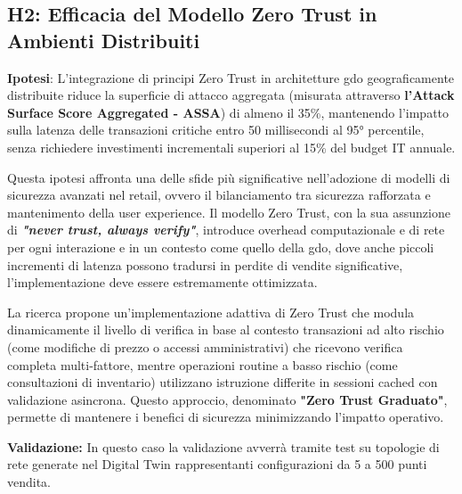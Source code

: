\subsection{\texorpdfstring{\textbf{H2: Efficacia del Modello Zero Trust in Ambienti Distribuiti}}{1.4.2 - H2: Efficacia del Modello Zero Trust in Ambienti Distribuiti}}

\label{ssec:h2}
\textbf{Ipotesi}: L'integrazione di principi Zero Trust in architetture \gls{gdo} geograficamente distribuite riduce la superficie di attacco aggregata (misurata attraverso \textbf{l'Attack Surface Score Aggregated - ASSA}) di almeno il 35\%, mantenendo l'impatto sulla latenza delle transazioni critiche entro 50 millisecondi al 95° percentile, senza richiedere investimenti incrementali superiori al 15\% del budget IT annuale.

Questa ipotesi affronta una delle sfide più significative nell'adozione di modelli di sicurezza avanzati nel retail, ovvero il bilanciamento tra sicurezza rafforzata e mantenimento della user experience. Il modello Zero Trust, con la sua assunzione di \textit{\textbf{"never trust, always verify"}}, introduce overhead computazionale e di rete per ogni interazione e in un contesto come quello della \gls{gdo}, dove anche piccoli incrementi di latenza possono tradursi in perdite di vendite significative, l'implementazione deve essere estremamente ottimizzata.

La ricerca propone un'implementazione adattiva di Zero Trust che modula dinamicamente il livello di verifica in base al contesto transazioni ad alto rischio (come modifiche di prezzo o accessi amministrativi) che ricevono verifica completa multi-fattore, mentre operazioni routine a basso rischio (come consultazioni di inventario) utilizzano istruzione differite in sessioni cached con validazione asincrona. Questo approccio, denominato \textbf{"Zero Trust Graduato"}, permette di mantenere i benefici di sicurezza minimizzando l'impatto operativo.

\textbf{Validazione:} In questo caso la validazione avverrà tramite test su topologie di rete generate nel Digital Twin rappresentanti configurazioni da 5 a 500 punti vendita.

